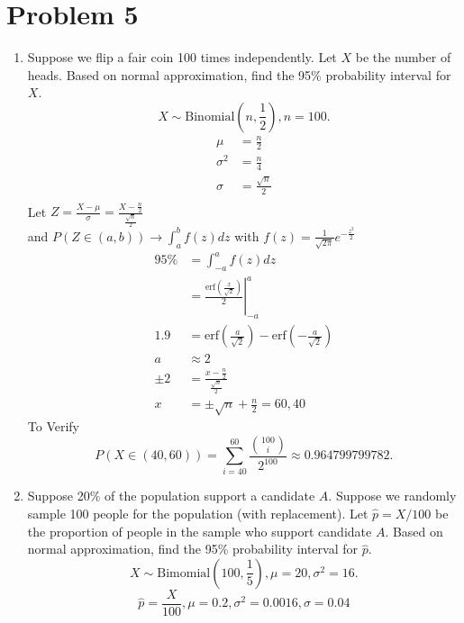 \documentclass{article}
\begin{document}
    \section{Problem 5}
    \begin{enumerate}
        \item Suppose we flip a fair coin 100 times independently. Let $X$ be the number of heads. Based on normal approximation, find the 95\% probability interval for $X$.
            \[
                X \sim \text{Binomial}(n, \frac{1}{2}), n = 100
            .\] 
            \begin{align*}
                \mu &= \frac{n}{2} \\
                \sigma^2 &= \frac{n}{4}\\
                \sigma &= \frac{\sqrt{n}}{2}\\
            \end{align*}
            Let $Z = \frac{X-\mu }{\sigma } = \frac{X-\frac{n}{2}}{\frac{\sqrt{n}}{2}}$\\
            and $P(Z \in (a,b)) \rightarrow \int_{a}^{b}f(z)dz$ with $f(z) = \frac{1}{\sqrt{2\pi }}e^{-\frac{z^2}{2}}$
            \begin{align*}
                95\% &= \int_{-a}^{a} f(z)dz\\
                     &= \left. \frac{\text{erf}(\frac{x}{\sqrt{2}})}{2} \right|_{-a}^{a} \\
                1.9 &= \text{erf}(\frac{a}{\sqrt{2}}) - \text{erf}(-\frac{a}{\sqrt{2}})\\
                a &\approx 2\\
                \pm2 &= \frac{x-\frac{n}{2}}{\frac{\sqrt{n}}{2}}\\
                x &= \pm\sqrt{n}+\frac{n}{2} = 60,40
            \end{align*}
            To Verify
            \[
            P(X \in (40, 60)) = \sum_{i=40}^{60}\frac{\binom{100}{i}}{2^{100}} \approx 0.964799799782
            .\] 
        \item Suppose 20\% of the population support a candidate $A$. Suppose we randomly sample 100 people for the population (with replacement). Let $\hat{p} = X/100$ be the proportion of people in the sample who support candidate $A$. Based on normal approximation, find the 95\% probability interval for $\hat{p}$.
            \[
                X \sim \text{Bimomial}(100, \frac{1}{5}), \mu = 20, \sigma^2 = 16
            .\] 
            \[
                \hat{p} = \frac{X}{100}, \mu = 0.2, \sigma^2 = 0.0016, \sigma = 0.04
\]
\end{enumerate}
\end{document}
